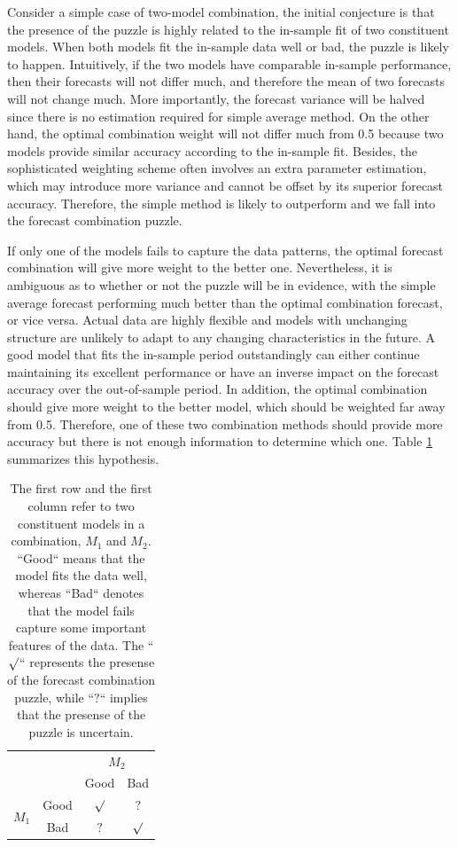 \documentclass{monashthesis}
\begin{document}
Consider a simple case of two-model combination, the initial conjecture is that the presence of the puzzle is highly related to the in-sample fit of two constituent models. When both models fit the in-sample data well or bad, the puzzle is likely to happen. Intuitively, if the two models have comparable in-sample performance, then their forecasts will not differ much, and therefore the mean of two forecasts will not change much. More importantly, the forecast variance will be halved since there is no estimation required for simple average method. On the other hand, the optimal combination weight will not differ much from 0.5 because two models provide similar accuracy according to the in-sample fit. Besides, the sophisticated weighting scheme often involves an extra parameter estimation, which may introduce more variance and cannot be offset by its superior forecast accuracy. Therefore, the simple method is likely to outperform and we fall into the forecast combination puzzle.

If only one of the models fails to capture the data patterns, the optimal forecast combination will give more weight to the better one. Nevertheless, it is ambiguous as to whether or not the puzzle will be in evidence, with the simple average forecast performing much better than the optimal combination forecast, or vice versa. Actual data are highly flexible and models with unchanging structure are unlikely to adapt to any changing characteristics in the future. A good model that fits the in-sample period outstandingly can either continue maintaining its excellent performance or have an inverse impact on the forecast accuracy over the out-of-sample period. In addition, the optimal combination should give more weight to the better model, which should be weighted far away from 0.5. Therefore, one of these two combination methods should provide more accuracy but there is not enough information to determine which one. Table \ref{tab:1} summarizes this hypothesis.

\begin{table}[ht]
\centering
\begin{tabular}{cccc}
                       &      & \multicolumn{2}{c}{$M_2$} \\
                       &      & Good       & Bad       \\
\multirow{2}{*}{$M_1$} & Good & $\surd$    & $?$ \\
                       & Bad  & $?$        & $\surd$
\end{tabular}
\caption{The first row and the first column refer to two constituent models in a combination, $M_1$ and $M_2$. ``Good`` means that the model fits the data well, whereas ``Bad`` denotes that the model fails capture some important features of the data. The ``$\surd$`` represents the presense of the forecast combination puzzle, while ``$?$`` implies that the presense of the puzzle is uncertain.}
\label{tab:1}
\end{table}
\end{document}
